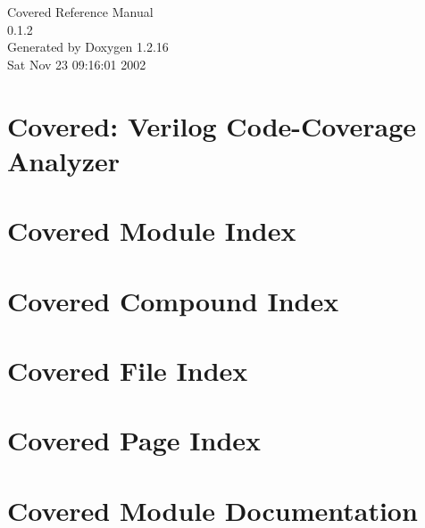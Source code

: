 \documentclass[a4paper]{book}
\begin{document}
\begin{titlepage}
\vspace*{7cm}
\begin{center}
{\Large Covered Reference Manual\\[1ex]\large 0.1.2}\\
\vspace*{1cm}
{\large Generated by Doxygen 1.2.16}\\
\vspace*{0.5cm}
{\small Sat Nov 23 09:16:01 2002}\\
\end{center}
\end{titlepage}
\clearemptydoublepage
{}
\tableofcontents
\clearemptydoublepage
{}
\chapter{Covered: Verilog Code-Coverage Analyzer}
\label{index}
\chapter{Covered Module Index}

\chapter{Covered Compound Index}

\chapter{Covered File Index}

\chapter{Covered Page Index}

\chapter{Covered Module Documentation}













\end{document}
